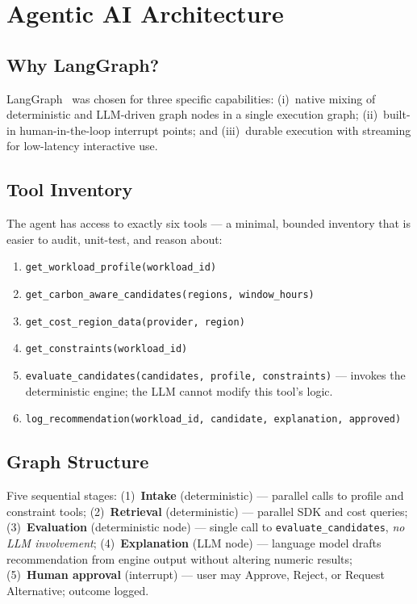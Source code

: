 ﻿\documentclass[conference]{IEEEtran}
\begin{document}
\section{Agentic AI Architecture}

\subsection{Why LangGraph?}

LangGraph~\cite{langgraph_docs} was chosen for three specific capabilities:
(i)~native mixing of deterministic and LLM-driven graph nodes in a single execution
graph; (ii)~built-in human-in-the-loop interrupt points; and (iii)~durable execution
with streaming for low-latency interactive use.

\subsection{Tool Inventory}

The agent has access to exactly six tools --- a minimal, bounded inventory that is
easier to audit, unit-test, and reason about:
\begin{enumerate}
\item \texttt{get\_workload\_profile(workload\_id)}
\item \texttt{get\_carbon\_aware\_candidates(regions, window\_hours)}
\item \texttt{get\_cost\_region\_data(provider, region)}
\item \texttt{get\_constraints(workload\_id)}
\item \texttt{evaluate\_candidates(candidates, profile, constraints)}
--- invokes the deterministic engine; the LLM cannot modify this tool's logic.
\item \texttt{log\_recommendation(workload\_id, candidate, explanation, approved)}
\end{enumerate}

\subsection{Graph Structure}

Five sequential stages:
(1)~\textbf{Intake} (deterministic) --- parallel calls to profile and constraint tools;
(2)~\textbf{Retrieval} (deterministic) --- parallel SDK and cost queries;
(3)~\textbf{Evaluation} (deterministic node) --- single call to
\texttt{evaluate\_candidates}, \emph{no LLM involvement};
(4)~\textbf{Explanation} (LLM node) --- language model drafts recommendation from
engine output without altering numeric results;
(5)~\textbf{Human approval} (interrupt) --- user may Approve, Reject,
or Request Alternative; outcome logged.
\end{document}
